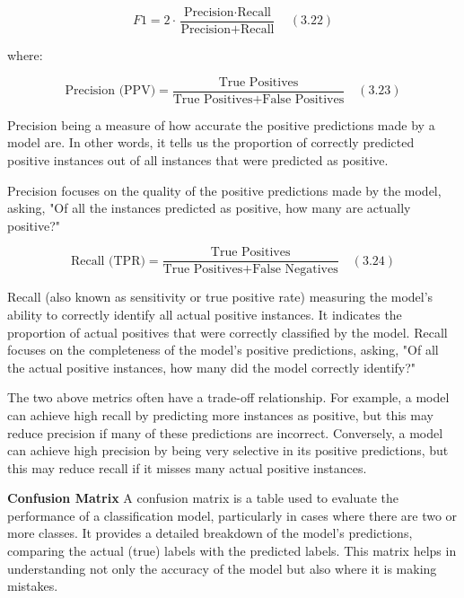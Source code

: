 \documentclass{Configuration_Files/PoliMi3i_thesis}
\begin{document}
\begin{equation}
F1 = 2 \cdot \frac{\text{Precision} \cdot \text{Recall}}{\text{Precision} + \text{Recall}} \quad (3.22)
\end{equation}

where:

\begin{equation}
\text{Precision (PPV)} = \frac{\text{True Positives}}{\text{True Positives} + \text{False Positives}} \quad (3.23)
\end{equation}

Precision being a measure of how accurate the positive predictions made by a model are. In other words, it tells us the proportion of correctly predicted positive instances out of all instances that were predicted as positive.

Precision focuses on the quality of the positive predictions made by the model, asking, "Of all the instances predicted as positive, how many are actually positive?"

\begin{equation}
\text{Recall (TPR)} = \frac{\text{True Positives}}{\text{True Positives} + \text{False Negatives}} \quad (3.24)
\end{equation}

Recall (also known as sensitivity or true positive rate) measuring the model's ability to correctly identify all actual positive instances. It indicates the proportion of actual positives that were correctly classified by the model.
Recall focuses on the completeness of the model's positive predictions, asking, "Of all the actual positive instances, how many did the model correctly identify?"

The two above metrics often have a trade-off relationship. For example, a model can achieve high recall by predicting more instances as positive, but this may reduce precision if many of these predictions are incorrect. Conversely, a model can achieve high precision by being very selective in its positive predictions, but this may reduce recall if it misses many actual positive instances.

\textbf{Confusion Matrix} \quad A confusion matrix is a table used to evaluate the performance of a classification model, particularly in cases where there are two or more classes. It provides a detailed breakdown of the model’s predictions, comparing the actual (true) labels with the predicted labels. This matrix helps in understanding not only the accuracy of the model but also where it is making mistakes.
\end{document}
